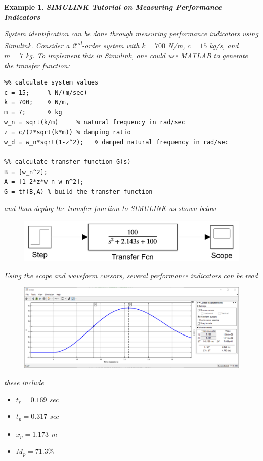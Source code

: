 \documentclass[12pt,letter]{article}
\newtheorem{ex}{Example}
\numberwithin{ex}{section} %
\newenvironment{example}{\begin{mdframed}[middlelinewidth=0.5mm]\begin{ex}\normalfont}{\end{ex}\end{mdframed}}
\numberwithin{re}{section} %
\numberwithin{equation}{section}	%
\begin{document}
\begin{example}

\textbf{SIMULINK Tutorial on Measuring Performance Indicators}

System identification can be done through measuring performance indicators using Simulink. Consider a 2\textsuperscript{nd}-order system with $k=700$ N/m, $c=15$ kg/s, and $m=7$ kg. To implement this in Simulink, one could use MATLAB to generate the transfer function:

\lstset{linewidth=5.8in}
\begin{minipage}{1\textwidth}
  \begin{center}
\begin{lstlisting}
%% calculate system values
c = 15;     % N/(m/sec)
k = 700;    % N/m,
m = 7;      % kg
w_n = sqrt(k/m)     % natural frequency in rad/sec
z = c/(2*sqrt(k*m)) % damping ratio
w_d = w_n*sqrt(1-z^2);   % damped natural frequency in rad/sec

%% calculate transfer function G(s)
B = [w_n^2];
A = [1 2*z*w_n w_n^2];
G = tf(B,A) % build the transfer function
\end{lstlisting}
  \end{center}
\end{minipage}

and than deploy the transfer function to SIMULINK as shown below
\begin{figure}[H]
	\centering
	\includegraphics[width=4.5in]{../figures/Simulink_step_model_transfer_2nd_oder_2}
\end{figure}

Using the scope and waveform cursors, several performance indicators can be read
\begin{figure}[H]
	\centering
	\includegraphics[width=6.0in]{../figures/Simulink_step_model_transfer_cursor_measurements_2nd_oder_2}
\end{figure}
these include
\begin{itemize}
\item $t_r = 0.169$ sec
\item $t_p = 0.317$ sec
\item $x_p = 1.173$ m
\item $M_p = 71.3\%$
\end{itemize}


\end{example}
\end{document}
